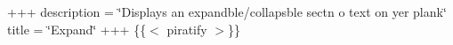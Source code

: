 +++ description = \char`\"{}\+Displays an expand\textquotesingle{}ble/collaps\textquotesingle{}ble sect\textquotesingle{}n o\textquotesingle{} text on yer plank\char`\"{} title = \char`\"{}\+Expand\char`\"{} +++ \{\{$<$ piratify $>$\}\} 